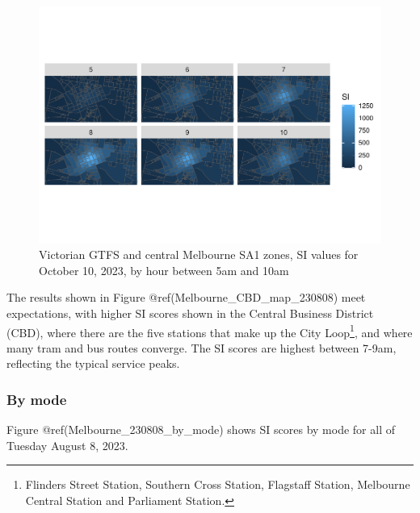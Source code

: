 \documentclass[preprint, 3p,
authoryear]{elsarticle} %
\begin{document}
\begin{figure}
\centering
\includegraphics{Leveraging_GTFS_to_assess_transit_supply_Transport_Geography_files/figure-latex/Melbourne_CBD_map_230808-1.pdf}
\caption{Victorian GTFS and central Melbourne SA1 zones, SI values for
October 10, 2023, by hour between 5am and 10am}
\end{figure}

The results shown in Figure @ref(Melbourne\_CBD\_map\_230808) meet
expectations, with higher SI scores shown in the Central Business
District (CBD), where there are the five stations that make up the City
Loop\footnote{Flinders Street Station, Southern Cross Station, Flagstaff
  Station, Melbourne Central Station and Parliament Station.}, and where
many tram and bus routes converge. The SI scores are highest between
7-9am, reflecting the typical service peaks.

\hypertarget{by-mode}{%
\subsubsection{By mode}\label{by-mode}}

Figure @ref(Melbourne\_230808\_by\_mode) shows SI scores by mode for all
of Tuesday August 8, 2023.
\end{document}
